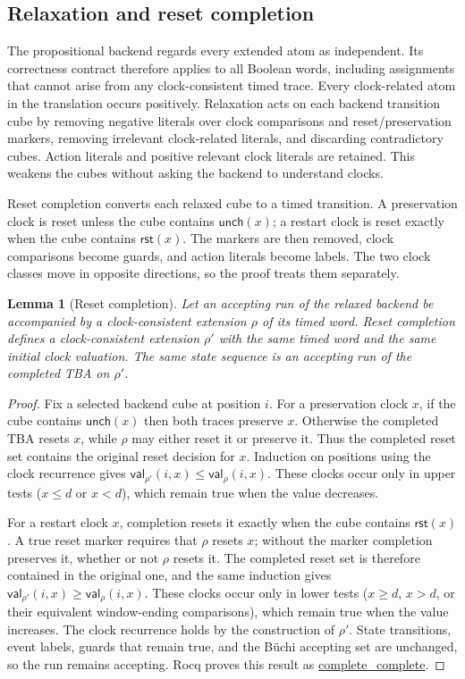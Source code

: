 \documentclass{ieeeaccess}
\newtheorem{lemma}[theorem]{Lemma}
\newcommand{\Reset}{\mathsf{rst}}
\newcommand{\Unch}{\mathsf{unch}}
\newcommand{\CVal}{\mathsf{val}}
\newcommand{\Rocqid}[1]{\url{#1}}
\begin{document}
\subsection{Relaxation and reset completion}
\label{sec:reset-completion}
The propositional backend regards every extended atom as independent. Its
correctness contract therefore applies to all Boolean words, including
assignments that cannot arise from any clock-consistent timed trace. Every
clock-related atom in the translation occurs positively. Relaxation acts on
each backend transition cube by removing negative literals over clock
comparisons and reset/preservation markers, removing irrelevant
clock-related literals, and discarding contradictory cubes. Action literals
and positive relevant clock literals are retained. This weakens the cubes
without asking the backend to understand clocks.

Reset completion converts each relaxed cube to a timed transition. A
preservation clock is reset unless the cube contains $\Unch(x)$; a restart
clock is reset exactly when the cube contains $\Reset(x)$. The markers are
then removed, clock comparisons become guards, and action literals become
labels. The two clock classes move in opposite directions, so the proof
treats them separately.

\begin{lemma}[Reset completion]
\label{lem:reset-completion}
Let an accepting run of the relaxed backend be accompanied by a
clock-consistent extension $\rho$ of its timed word. Reset completion
defines a clock-consistent extension $\rho'$ with the same timed word and
the same initial clock valuation. The same state sequence is an accepting
run of the completed TBA on $\rho'$.
\end{lemma}
\begin{proof}
Fix a selected backend cube at position $i$. For a preservation clock $x$,
if the cube contains $\Unch(x)$ then both traces preserve $x$. Otherwise the
completed TBA resets $x$, while $\rho$ may either reset it or preserve it.
Thus the completed reset set contains the original reset decision for $x$.
Induction on positions using the clock recurrence gives
$\CVal_{\rho'}(i,x)\le\CVal_\rho(i,x)$. These clocks occur only in upper
tests ($x\le d$ or $x<d$), which remain true when the value decreases.

For a restart clock $x$, completion resets it exactly when the cube contains
$\Reset(x)$. A true reset marker requires that $\rho$ resets $x$; without the
marker completion preserves it, whether or not $\rho$ resets it. The
completed reset set is therefore contained in the original one, and the same
induction gives $\CVal_{\rho'}(i,x)\ge\CVal_\rho(i,x)$. These clocks occur
only in lower tests ($x\ge d$, $x>d$, or their equivalent window-ending
comparisons), which remain true when the value increases. The clock recurrence
holds by the construction of $\rho'$. State transitions, event labels,
guards that remain true, and the Büchi accepting set are unchanged, so the
run remains accepting. Rocq proves this result as
\Rocqid{complete_complete}.
\end{proof}
\end{document}
